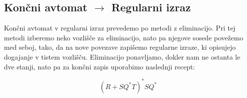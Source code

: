 \documentclass[10pt,a4paper,oneside]{book}
\begin{document}

\subsection{Končni avtomat $\rightarrow$ Regularni izraz}
Končni avtomat v regularni izraz prevedemo po metodi z eliminacijo. Pri tej metodi izberemo neko vozlišče za eliminacijo, nato pa njegove sosede povežemo med seboj, tako, da na nove povezave zapišemo regularne izraze, ki opisujejo dogajanje v tistem vozlišču. Eliminacijo ponavljamo, dokler nam ne ostanta le dve stanji, nato pa za končni zapis uporabimo naslednji recept:

\begin{displaymath}
(R+SQ^*T)^*SQ^*
\end{displaymath}

\end{document}
